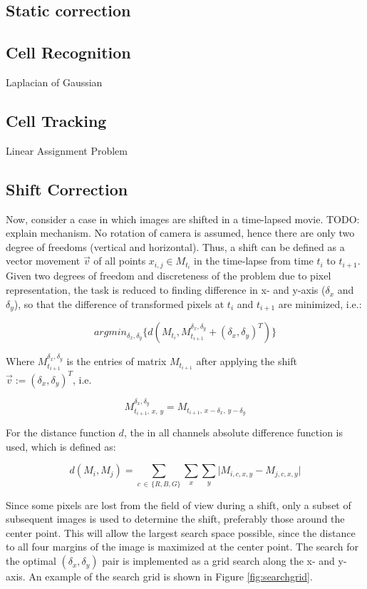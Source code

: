\documentclass[pdftex,12pt,a4paper]{report}
\begin{document}
\subsection{Static correction}

\subsection{Cell Recognition}

Laplacian of Gaussian

\subsection{Cell Tracking}

Linear Assignment Problem

\subsection{Shift Correction}

Now, consider a case in which images are shifted in a time-lapsed movie. TODO: explain mechanism. No rotation of camera is assumed, hence there are only two degree of freedoms (vertical and horizontal). Thus, a shift can be defined as a vector movement $\vec{v}$ of all points $x_{i,j} \in M_{t_i}$ in the time-lapse from time $t_i$ to $t_{i+1}$. Given two degrees of freedom and discreteness of the problem due to pixel representation, the task is reduced to finding difference in x- and y-axis ($\delta_x$ and $\delta_y$), so that the difference of transformed pixels at $t_i$ and $t_{i+1}$ are minimized, i.e.:

$$
argmin_{\delta_x, \delta_y} \{d(M_{t_i}, M_{t_{i+1}}^{\delta_x, \delta_y} + (\delta_x, \delta_y)^T)\}
$$

Where $M_{t_{i+1}}^{\delta_x, \delta_y}$ is the entries of matrix $M_{t_{i+1}}$ after applying the shift $\vec{v} := (\delta_x, \delta_y)^T$, i.e.

$$M_{t_{i+1}, \, x, \, y}^{\delta_x, \delta_y} = M_{t_{i+1}, \, x - \delta_x, \, y - \delta_y}$$

For the distance function $d$, the in all channels absolute difference function is used, which is defined as:

$$
d(M_i, M_j) = \sum_{c \, \in \, \{R, B, G\}} \sum_{x} \sum_{y} \vert M_{i, c, x, y} - M_{j, c, x, y} \vert
$$


Since some pixels are lost from the field of view during a shift, only a subset of subsequent images is used to determine the shift, preferably those around the center point. This will allow the largest search space possible, since the distance to all four margins of the image is maximized at the center point. The search for the optimal $(\delta_x, \delta_y)$ pair is implemented as a grid search along the x- and y-axis. An example of the search grid is shown in Figure \ref{fig:searchgrid}.\\
\end{document}
